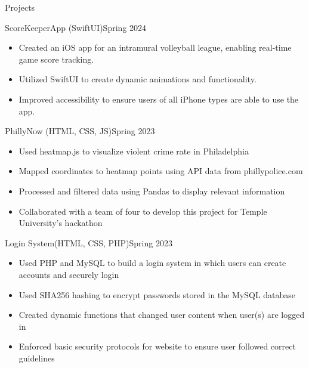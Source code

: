 \documentclass[]{mcdowellcv}
\begin{document}
	\begin{cvsection}{Projects}
		\begin{cvsubsection}{ScoreKeeperApp (SwiftUI)}{}{Spring 2024}
			\begin{itemize}
				\item Created an iOS app for an intramural volleyball league, enabling real-time game score tracking.
				\item Utilized SwiftUI to create dynamic animations and functionality.
				\item Improved accessibility to ensure users of all iPhone types are able to use the app.
			\end{itemize}
		\end{cvsubsection}

		\begin{cvsubsection}{PhillyNow (HTML, CSS, JS)}{}{Spring 2023}
			\begin{itemize}
				\item Used heatmap.js to visualize violent crime rate in Philadelphia
				\item Mapped coordinates to heatmap points using API data from phillypolice.com
				\item Processed and filtered data using Pandas to display relevant information
				\item Collaborated with a team of four to develop this project for Temple University's hackathon
			\end{itemize}
		\end{cvsubsection}

		\begin{cvsubsection}{Login System(HTML, CSS, PHP)}{}{Spring 2023}
			\begin{itemize}
				\item Used PHP and MySQL to build a login system in which users can create accounts and securely login
				\item Used SHA256 hashing to encrypt passwords stored in the MySQL database
				\item Created dynamic functions that changed user content when user(s) are logged in
				\item Enforced basic security protocols for website to ensure user followed correct guidelines
			\end{itemize}
		\end{cvsubsection}
	\end{cvsection}


	
\end{document}

